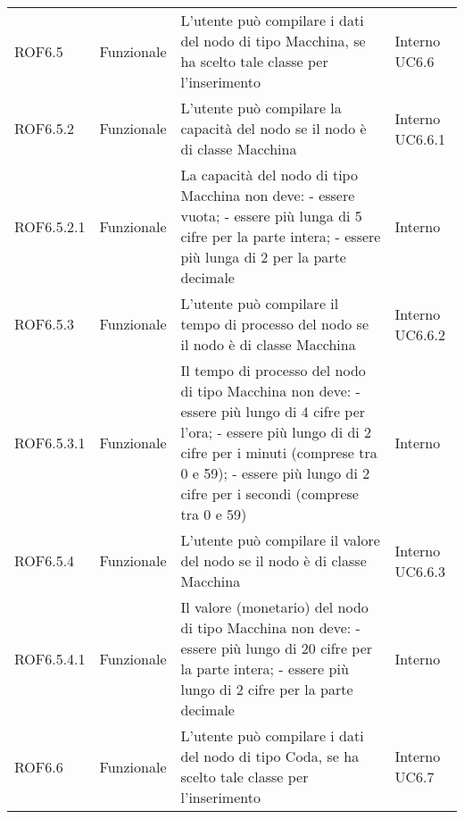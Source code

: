 \begin{longtable}{p{2cm}!{\VRule[1pt]}p{2cm}!{\VRule[1pt]}p{5cm}!{\VRule[1pt]}p{1.5cm}}
	\\
	ROF6.5                           & Funzionale\newline               & L'utente può compilare i dati del nodo di tipo Macchina, se ha scelto tale classe per l'inserimento                      & Interno \newline UC6.6       
	\\
	ROF6.5.2                         & Funzionale\newline               & L'utente può compilare la capacità  del nodo se il nodo è di classe Macchina                                           & Interno \newline UC6.6.1     
	\\
	ROF6.5.2.1&Funzionale\newline  & La capacità del nodo di tipo Macchina non deve:
	- essere vuota;
	- essere più lunga di 5 cifre per la parte intera;
	- essere più lunga di 2 per la parte decimale & Interno \\
	ROF6.5.3                         & Funzionale\newline               & L'utente può compilare il tempo di processo del nodo se il nodo è di classe Macchina                                    & Interno \newline UC6.6.2     
	\\
	ROF6.5.3.1&Funzionale\newline  & Il tempo di processo del nodo di tipo Macchina non deve:
	- essere più lungo di 4 cifre per l'ora;
	- essere più lungo di di 2 cifre per i minuti (comprese tra 0 e 59);
	- essere più lungo di 2 cifre per i secondi (comprese tra 0 e 59) & Interno \\
	ROF6.5.4                         & Funzionale\newline               & L'utente può compilare il valore del nodo se il nodo è di classe Macchina                                               & Interno \newline UC6.6.3     
	\\
	ROF6.5.4.1&Funzionale\newline  & Il valore (monetario) del nodo di tipo Macchina non deve:
	- essere più lungo di 20 cifre per la parte intera;
	- essere  più lungo di 2 cifre per la parte decimale & Interno \\
	ROF6.6                           & Funzionale\newline               & L'utente può compilare i dati del nodo di tipo Coda, se ha scelto tale classe per l'inserimento                          & Interno \newline UC6.7       

\end{longtable}
